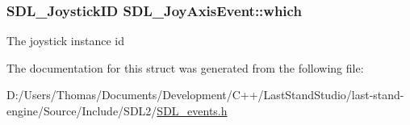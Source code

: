 \subsubsection[{which}]{\setlength{\rightskip}{0pt plus 5cm}S\+D\+L\+\_\+\+Joystick\+I\+D S\+D\+L\+\_\+\+Joy\+Axis\+Event\+::which}\label{structSDL__JoyAxisEvent_a965719f4703a7091bcc5f07f79fcf7e1}
The joystick instance id 

The documentation for this struct was generated from the following file\+:\begin{DoxyCompactItemize}
\item 
D\+:/\+Users/\+Thomas/\+Documents/\+Development/\+C++/\+Last\+Stand\+Studio/last-\/stand-\/engine/\+Source/\+Include/\+S\+D\+L2/\hyperlink{SDL__events_8h}{S\+D\+L\+\_\+events.\+h}\end{DoxyCompactItemize}
